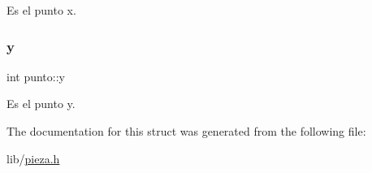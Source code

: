 Es el punto x. \mbox{\label{structpunto_a31195a01422c6e9574235d9b0bf8d285}} 
\subsubsection{\texorpdfstring{y}{y}}
{\footnotesize\ttfamily int punto\+::y}

Es el punto y. 

The documentation for this struct was generated from the following file\+:\begin{DoxyCompactItemize}
\item 
lib/\hyperlink{pieza_8h}{pieza.\+h}\end{DoxyCompactItemize}
